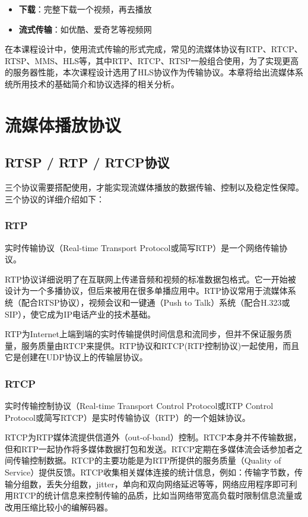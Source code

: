 \documentclass[bachelor]{thesis-uestc}
\begin{document}
\begin{itemize}
	\item \textbf{下载}：完整下载一个视频，再去播放
	\item \textbf{流式传输}：如优酷、爱奇艺等视频网
\end{itemize}

在本课程设计中，使用流式传输的形式完成，常见的流媒体协议有RTP、RTCP、RTSP、MMS、HLS等，其中RTP、RTCP、RTSP一般组合使用，为了实现更高的服务器性能，本次课程设计选用了HLS协议作为传输协议。本章将给出流媒体系统所用技术的基础简介和协议选择的相关分析。

\section{流媒体播放协议}

\subsection{RTSP / RTP / RTCP协议}
三个协议需要搭配使用，才能实现流媒体播放的数据传输、控制以及稳定性保障。三个协议的详细介绍如下：

\subsubsection{RTP}


\par 实时传输协议（Real-time Transport Protocol或简写RTP）是一个网络传输协议。

\par RTP协议详细说明了在互联网上传递音频和视频的标准数据包格式。它一开始被设计为一个多播协议，但后来被用在很多单播应用中。RTP协议常用于流媒体系统（配合RTSP协议），视频会议和一键通（Push to Talk）系统（配合H.323或SIP），使它成为IP电话产业的技术基础。

\par RTP为Internet上端到端的实时传输提供时间信息和流同步，但并不保证服务质量，服务质量由RTCP来提供。RTP协议和RTCP(RTP控制协议)一起使用，而且它是创建在UDP协议上的传输层协议。

\subsubsection{RTCP}
\par 实时传输控制协议（Real-time Transport Control Protocol或RTP Control Protocol或简写RTCP）是实时传输协议（RTP）的一个姐妹协议。

\par RTCP为RTP媒体流提供信道外（out-of-band）控制。RTCP本身并不传输数据，但和RTP一起协作将多媒体数据打包和发送。RTCP定期在多媒体流会话参加者之间传输控制数据。RTCP的主要功能是为RTP所提供的服务质量（Quality of Service）提供反馈。RTCP收集相关媒体连接的统计信息，例如：传输字节数，传输分组数，丢失分组数，jitter，单向和双向网络延迟等等，网络应用程序即可利用RTCP的统计信息来控制传输的品质，比如当网络带宽高负载时限制信息流量或改用压缩比较小的编解码器。
\end{document}
